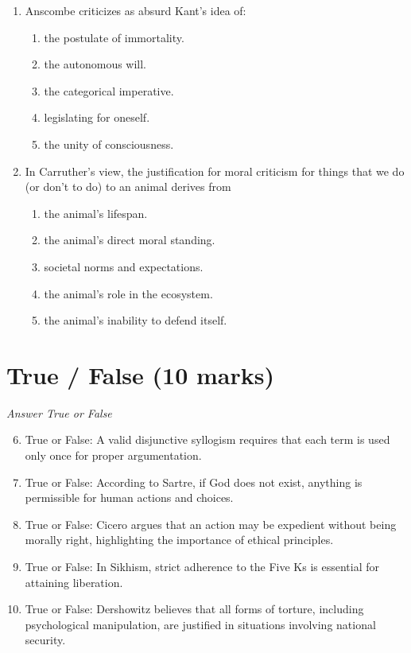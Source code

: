 \documentclass[12pt]{article}
\begin{document}
\begin{enumerate}[label=\arabic*.]
\begin{enumerate}[label=(\alph*)]
\end{enumerate}
\item Anscombe criticizes as absurd Kant's idea of:
\begin{enumerate}[label=(\alph*)]
    \item the postulate of immortality.
    \item the autonomous will.
    \item the categorical imperative.
    \item legislating for oneself.
    \item the unity of consciousness.
\end{enumerate}
\item In Carruther's view, the justification for moral criticism for things that we do (or don't to do) to an animal derives from
\begin{enumerate}[label=(\alph*)]
    \item the animal's lifespan.
    \item the animal's direct moral standing.
    \item societal norms and expectations.
    \item the animal's role in the ecosystem.
    \item the animal's inability to defend itself.
\end{enumerate}
\end{enumerate}

\section*{True / False (10 marks)}
\textit{Answer True or False}
\begin{enumerate}[label=\arabic*.]
\setcounter{enumi}{5}
\item True or False: A valid disjunctive syllogism requires that each term is used only once for proper argumentation.
\item True or False: According to Sartre, if God does not exist, anything is permissible for human actions and choices.
\item True or False: Cicero argues that an action may be expedient without being morally right, highlighting the importance of ethical principles.
\item True or False: In Sikhism, strict adherence to the Five Ks is essential for attaining liberation.
\item True or False: Dershowitz believes that all forms of torture, including psychological manipulation, are justified in situations involving national security.
\end{enumerate}
\end{document}
